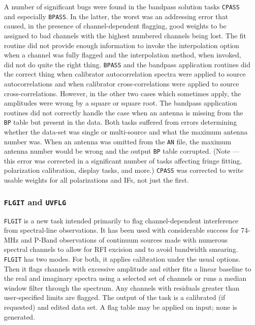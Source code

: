 A number of significant bugs were found in the bandpass solution tasks
{\tt CPASS} and especially \hbox{{\tt BPASS}}.  In the latter, the
worst was an addressing error that caused, in the presence of
channel-dependent flagging, good weights to be assigned to bad
channels with the highest numbered channels being lost.  The fit
routine did not provide enough information to invoke the interpolation
option when a channel was fully flagged and the interpolation method,
when invoked, did not do quite the right thing.  {\tt BPASS} and the
bandpass application routines did the correct thing when calibrator
autocorrelation spectra were applied to source autocorrelations and
when calibrator cross-correlations were applied to source
cross-correlations.  However, in the other two cases which sometimes
apply, the amplitudes were wrong by a square or square root.  The
bandpass application routines did not correctly handle the case when
an antenna is missing from the {\tt BP} table but present in the data.
Both tasks suffered from errors determining whether the data-set was
single or multi-source and what the maximum antenna number was.  When
an antenna was omitted from the {\tt AN} file, the maximum antenna
number would be wrong and the output {\tt BP} table corrupted.  (Note
--- this error was corrected in a significant number of tasks
affecting fringe fitting, polarization calibration, display tasks, and
more.)  {\tt CPASS} was corrected to write usable weights for all
polarizations and IFs, not just the first.

\subsubsection{{\tt FLGIT} and {\tt UVFLG}}

{\tt FLGIT} is a new task intended primarily to flag channel-dependent
interference from spectral-line observations.  It has been used with
considerable success for 74-MHz and P-Band observations of continuum
sources made with numerous spectral channels to allow for RFI excision
and to avoid bandwidth smearing.  {\tt FLGIT} has two modes.  For
both, it applies calibration under the usual options.  Then it flags
channels with excessive amplitude and either fits a linear baseline to
the real and imaginary spectra using a selected set of channels or
runs a median window filter through the spectrum.  Any channels with
residuals greater than user-specified limits are flagged.  The output
of the task is a calibrated (if requested) and edited data set.  A
flag table may be applied on input; none is generated.

